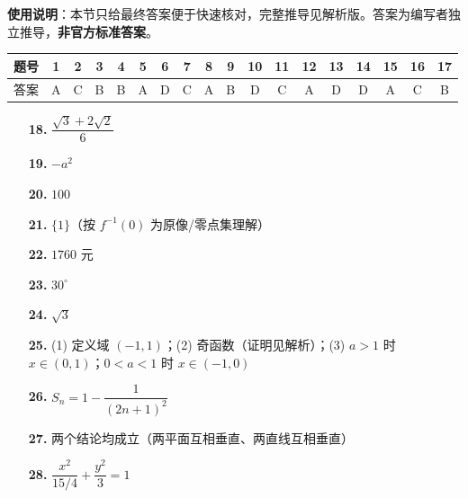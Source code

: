 
\begin{gknotice}
\textbf{使用说明}：本节只给最终答案便于快速核对，完整推导见解析版。答案为编写者独立推导，\textbf{非官方标准答案}。
\end{gknotice}

\begin{center}\begin{tabular}{cccccccccccccccccc}
\toprule
题号 & 1 & 2 & 3 & 4 & 5 & 6 & 7 & 8 & 9 & 10 & 11 & 12 & 13 & 14 & 15 & 16 & 17 \\
\midrule
答案 & A & C & B & B & A & D & C & A & B & D & C & A & D & D & A & C & B \\
\bottomrule
\end{tabular}\end{center}

\begin{itemize}[leftmargin=2.6em]
  \item[\textbf{18.}] \(\dfrac{\sqrt3+2\sqrt2}{6}\)
  \item[\textbf{19.}] \(-a^2\)
  \item[\textbf{20.}] \(100\)
  \item[\textbf{21.}] \(\{1\}\)（按 \(f^{-1}(0)\) 为原像/零点集理解）
  \item[\textbf{22.}] \(1760\) 元
  \item[\textbf{23.}] \(30^\circ\)
\end{itemize}

\begin{itemize}[leftmargin=2.6em]
  \item[\textbf{24.}] \(\sqrt3\)
  \item[\textbf{25.}] (1) 定义域 \((-1,1)\)；(2) 奇函数（证明见解析）；(3) \(a>1\) 时 \(x\in(0,1)\)；\(0<a<1\) 时 \(x\in(-1,0)\)
  \item[\textbf{26.}] \(S_n=1-\dfrac{1}{(2n+1)^2}\)
  \item[\textbf{27.}] 两个结论均成立（两平面互相垂直、两直线互相垂直）
  \item[\textbf{28.}] \(\dfrac{x^2}{15/4}+\dfrac{y^2}{3}=1\)
\end{itemize}
